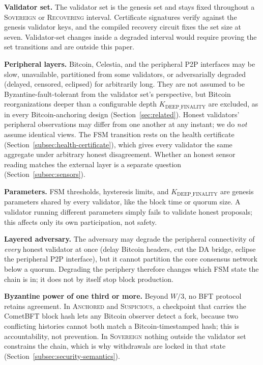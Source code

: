 \textbf{Validator set.} The validator set is the genesis set and stays fixed
throughout a \textsc{Sovereign} or \textsc{Recovering} interval. Certificate
signatures verify against the genesis validator keys, and the compiled
recovery circuit fixes the set size at seven. Validator-set changes inside a
degraded interval would require proving the set transitions and are outside
this paper.

\textbf{Peripheral layers.} Bitcoin, Celestia, and the peripheral P2P
interfaces may be slow, unavailable, partitioned from some validators, or
adversarially degraded (delayed, censored, eclipsed) for arbitrarily long.
They are not assumed to be Byzantine-fault-tolerant from the validator set's
perspective, but Bitcoin reorganizations deeper than a configurable depth
$K_{\text{DEEP\_FINALITY}}$ are excluded, as in every Bitcoin-anchoring
design (Section~\ref{sec:related}). Honest validators' peripheral
observations may differ from one another at any instant; we do \emph{not}
assume identical views. The FSM transition rests on the health certificate
(Section~\ref{subsec:health-certificate}), which gives every validator the
same aggregate under arbitrary honest disagreement. Whether an honest
sensor reading matches the external layer is a separate question
(Section~\ref{subsec:sensors}).

\textbf{Parameters.} FSM thresholds, hysteresis limits, and
$K_{\text{DEEP\_FINALITY}}$ are genesis parameters shared by every validator,
like the block time or quorum size. A validator running different parameters
simply fails to validate honest proposals; this affects only its own
participation, not safety.

\textbf{Layered adversary.} The adversary may degrade the peripheral
connectivity of \emph{every} honest validator at once (delay Bitcoin
headers, cut the DA bridge, eclipse the peripheral P2P interface), but it
cannot partition the core consensus network below a quorum.
Degrading the periphery therefore changes which FSM state the chain is in; it
does not by itself stop block production.

\textbf{Byzantine power of one third or more.} Beyond $W/3$, no BFT protocol
retains agreement. In \textsc{Anchored} and \textsc{Suspicious}, a
checkpoint that carries the CometBFT block hash lets any Bitcoin observer
detect a fork, because two conflicting histories cannot both match a
Bitcoin-timestamped hash; this is accountability, not prevention. In
\textsc{Sovereign} nothing outside the validator set constrains the chain,
which is why withdrawals are locked in that state
(Section~\ref{subsec:security-semantics}).

